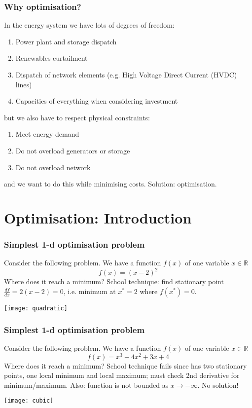 \documentclass[10pt,aspectratio=169,dvipsnames]{beamer}
\let\olditem\item
\renewcommand{\item}{%
\olditem\vspace{5pt}}
\begin{document}
\begin{frame}
  \frametitle{Why optimisation?}

  In the energy system we have lots of \alert{degrees of freedom}:
  \begin{enumerate}
  \item Power plant and storage dispatch
  \item Renewables curtailment
  \item Dispatch of network elements (e.g. High Voltage Direct Current (HVDC) lines)
    \item Capacities of everything when considering investment
  \end{enumerate}
  but we also have to respect \alert{physical constraints}:
  \begin{enumerate}
    \item Meet energy demand
  \item Do not overload generators or storage
    \item Do not overload network
  \end{enumerate}
  and we want to do this while \alert{minimising costs}. Solution: \alert{optimisation}.

\end{frame}


\section{Optimisation: Introduction}

\begin{frame}
  \frametitle{Simplest 1-d optimisation problem}

  Consider the following problem. We have a function $f(x)$ of one variable $x \in \mathbb{R}$
  \begin{equation*}
    f(x) = (x-2)^2
  \end{equation*}
  Where does it reach a minimum? School technique: find stationary point $\frac{df}{dx} = 2(x-2) = 0$, i.e. minimum at $x^* = 2$ where $f(x^*)=0$.

  \centering
  \texttt{[image: quadratic]}
\end{frame}



\begin{frame}
  \frametitle{Simplest 1-d optimisation problem}

  Consider the following problem. We have a function $f(x)$ of one variable $x \in \mathbb{R}$
  \begin{equation*}
    f(x) = x^3 -4x^2+3x +4
  \end{equation*}
  Where does it reach a minimum? School technique fails since has two stationary points, one local minimum and local maximum; must check 2nd derivative for minimum/maximum. Also: function is not bounded as $x \to -\infty$.  No solution!

  \centering
  \texttt{[image: cubic]}
\end{frame}
\end{document}
